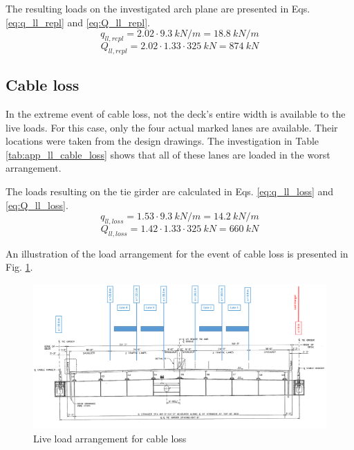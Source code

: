 The resulting loads on the investigated arch plane are presented in Eqs. \eqref{eq:q_ll_repl} and \eqref{eq:Q_ll_repl}.
\begin{equation}
    q_{ll, repl} = 2.02 \cdot \SI{9.3}{kN/m} = \SI{18.8}{kN/m}
    \label{eq:q_ll_repl}
\end{equation}
\begin{equation}
    Q_{ll, repl} = 2.02 \cdot 1.33 \cdot \SI{325}{kN} = \SI{874}{kN}
    \label{eq:Q_ll_repl}
\end{equation}

\subsection*{Cable loss} \label{Appendx_A_Live_loading_3}
In the extreme event of cable loss, not the deck's entire width is available to the live loads. For this case, only the four actual marked lanes are available. Their locations were taken from the design drawings. The investigation in Table \ref{tab:app_ll_cable_loss} shows that all of these lanes are loaded in the worst arrangement.


The loads resulting on the tie girder are calculated in Eqs. \eqref{eq:q_ll_loss} and \eqref{eq:Q_ll_loss}.
\begin{equation}
    q_{ll, loss} = 1.53 \cdot \SI{9.3}{kN/m} = \SI{14.2}{kN/m}
    \label{eq:q_ll_loss}
\end{equation}
\begin{equation}
    Q_{ll, loss} = 1.42 \cdot 1.33 \cdot \SI{325}{kN} = \SI{660}{kN}
    \label{eq:Q_ll_loss}
\end{equation}

An illustration of the load arrangement for the event of cable loss is presented in Fig. \ref{fig:app_hangers_cable_loss}.

\begin{figure}[H]
    \centering
    \includegraphics[width=\textwidth]{overleaf/Appendix/Pictures/Cross_Section_LL_Cable Loss.PNG}
    \caption{Live load arrangement for cable loss}
    \label{fig:app_hangers_cable_loss}
\end{figure}

